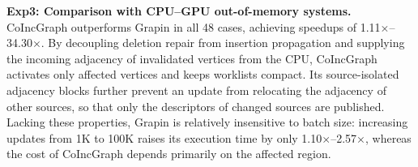 

\textbf{Exp3: Comparison with CPU--GPU out-of-memory systems.} CoIncGraph outperforms Grapin in all 48 cases, achieving speedups of 1.11$\times$--34.30$\times$. By decoupling deletion repair from insertion propagation and supplying the incoming adjacency of invalidated vertices from the CPU, CoIncGraph activates only affected vertices and keeps worklists compact. Its source-isolated adjacency blocks further prevent an update from relocating the adjacency of other sources, so that only the descriptors of changed sources are published. Lacking these properties, Grapin is relatively insensitive to batch size: increasing updates from 1K to 100K raises its execution time by only 1.10$\times$--2.57$\times$, whereas the cost of CoIncGraph depends primarily on the affected region.

